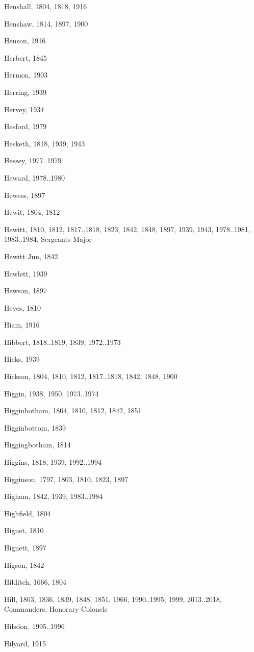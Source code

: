 {\begin{theindex}
\item Henshall, 1804, 1818, 1916
\item Henshaw, 1814, 1897, 1900
\item Henson, 1916
\item Herbert, 1845
\item Hermon, 1903
\item Herring, 1939
\item Hervey, 1934
\item Hesford, 1979
\item Hesketh, 1818, 1939, 1943
\item Hessey, 1977..1979
\item Heward, 1978..1980
\item Hewess, 1897
\item Hewit, 1804, 1812
\item Hewitt, 1810, 1812, 1817..1818, 1823, 1842, 1848, 1897, 1939, 1943, 1978..1981, 1983..1984, Sergeants Major
\item Hewitt Jun, 1842
\item Hewlett, 1939
\item Hewson, 1897
\item Heyes, 1810
\item Hiam, 1916
\item Hibbert, 1818..1819, 1839, 1972..1973
\item Hicks, 1939
\item Hickson, 1804, 1810, 1812, 1817..1818, 1842, 1848, 1900
\item Higgin, 1938, 1950, 1973..1974
\item Higginbotham, 1804, 1810, 1812, 1842, 1851
\item Higginbottom, 1839
\item Higgingbotham, 1814
\item Higgins, 1818, 1939, 1992..1994
\item Higginson, 1797, 1803, 1810, 1823, 1897
\item Higham, 1842, 1939, 1983..1984
\item Highfield, 1804
\item Hignet, 1810
\item Hignett, 1897
\item Higson, 1842
\item Hilditch, 1666, 1804
\item Hill, 1803, 1836, 1839, 1848, 1851, 1966, 1990..1995, 1999, 2013..2018, Commanders, Honorary Colonels
\item Hilsdon, 1995..1996
\item Hilyard, 1915

\end{theindex}}
